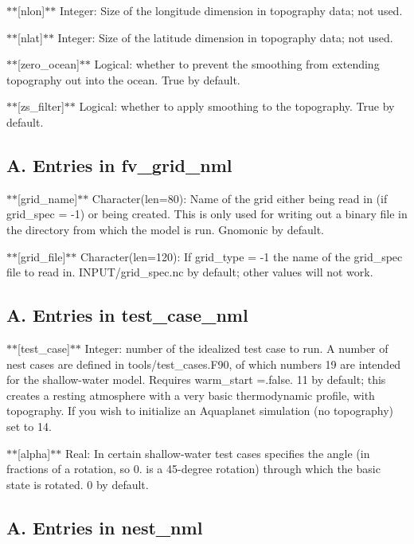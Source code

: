 $\ast$$\ast$\mbox{[}nlon\mbox{]}$\ast$$\ast$ Integer\-: Size of the longitude dimension in topography data; not used.

$\ast$$\ast$\mbox{[}nlat\mbox{]}$\ast$$\ast$ Integer\-: Size of the latitude dimension in topography data; not used.

$\ast$$\ast$\mbox{[}zero\-\_\-ocean\mbox{]}$\ast$$\ast$ Logical\-: whether to prevent the smoothing from extending topography out into the ocean. True by default.

$\ast$$\ast$\mbox{[}zs\-\_\-filter\mbox{]}$\ast$$\ast$ Logical\-: whether to apply smoothing to the topography. True by default.

\subsection*{A. Entries in fv\-\_\-grid\-\_\-nml}

$\ast$$\ast$\mbox{[}grid\-\_\-name\mbox{]}$\ast$$\ast$ Character(len=80)\-: Name of the grid either being read in (if grid\-\_\-spec = -\/1) or being created. This is only used for writing out a binary file in the directory from which the model is run. Gnomonic by default.

$\ast$$\ast$\mbox{[}grid\-\_\-file\mbox{]}$\ast$$\ast$ Character(len=120)\-: If grid\-\_\-type = -\/1 the name of the grid\-\_\-spec file to read in. I\-N\-P\-U\-T/grid\-\_\-spec.\-nc by default; other values will not work.

\subsection*{A. Entries in test\-\_\-case\-\_\-nml}

$\ast$$\ast$\mbox{[}test\-\_\-case\mbox{]}$\ast$$\ast$ Integer\-: number of the idealized test case to run. A number of nest cases are defined in tools/test\-\_\-cases.\-F90, of which numbers 19 are intended for the shallow-\/water model. Requires warm\-\_\-start =.false. 11 by default; this creates a resting atmosphere with a very basic thermodynamic profile, with topography. If you wish to initialize an Aquaplanet simulation (no topography) set to 14.

$\ast$$\ast$\mbox{[}alpha\mbox{]}$\ast$$\ast$ Real\-: In certain shallow-\/water test cases specifies the angle (in fractions of a rotation, so 0. is a 45-\/degree rotation) through which the basic state is rotated. 0 by default.

\subsection*{A. Entries in nest\-\_\-nml}

